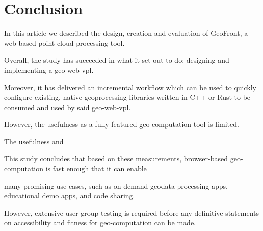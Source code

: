 \chapter{Conclusion}
\label{chap:conclusion}
In this article we described the design, creation and evaluation of GeoFront, a web-based point-cloud processing tool.

Overall, the study has succeeded in what it set out to do: designing and implementing a geo-web-vpl. 

Moreover, it has delivered an incremental workflow which can be used to quickly configure existing, native geoprocessing libraries written in C++ or Rust to be consumed and used by said geo-web-vpl.  

However, the usefulness as a fully-featured geo-computation tool is limited. 

The usefulness and 

This study concludes that based on these measurements, browser-based geo-computation  is fast enough that it can enable 

many promising use-cases, such as on-demand geodata processing apps, educational demo apps, and code sharing. 

However, extensive user-group testing is required before any definitive statements on accessibility and fitness for geo-computation can be made.  






